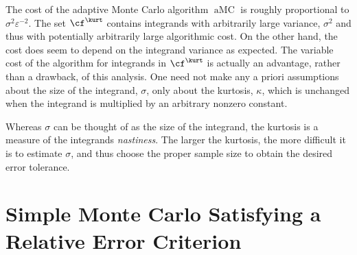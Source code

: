 \documentclass[graybox]{svmult}
\DeclareMathOperator{\aMC}{aMC}
\begin{document}
The cost of the adaptive Monte Carlo algorithm $\aMC$ is roughly proportional to $\sigma^2\varepsilon^{-2}$.  The set $\cf^{\kurt}$ contains integrands with arbitrarily large variance, $\sigma^2$ and thus with potentially arbitrarily large algorithmic cost.  On the other hand, the cost does seem to depend on the integrand variance as expected.  The variable cost of the algorithm for integrands in $\cf^{\kurt}$ is actually an advantage, rather than a drawback, of this analysis.  One need not make any a priori assumptions about the size of the integrand, $\sigma$, only about the kurtosis, $\kappa$, which is unchanged when the integrand is multiplied by an arbitrary nonzero constant.

Whereas $\sigma$ can be thought of as the size of the integrand, the kurtosis is a measure of the integrands \emph{nastiness}.  The larger the kurtosis, the more difficult it is to estimate $\sigma$, and thus choose the proper sample size to obtain the desired error tolerance.

\section{Simple Monte Carlo Satisfying a Relative Error Criterion} \label{relerrsec}
\end{document}
